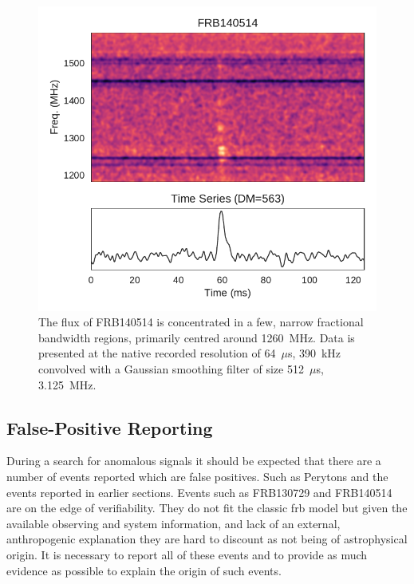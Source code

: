 \documentclass[a4paper,fleqn,usenatbib]{mnras}
\begin{document}
\begin{figure}
    \includegraphics[width=1.0\linewidth]{figures/FRB140514.pdf}
    \caption{The flux of FRB140514 is concentrated in a few, narrow fractional
    bandwidth regions, primarily centred around 1260~MHz.  Data is presented at
    the native recorded resolution of 64~$\mu$s, 390~kHz convolved with a
    Gaussian smoothing filter of size 512~$\mu$s, 3.125~MHz.
    }
    \label{fig:FRB140514}
\end{figure}

\subsection{False-Positive Reporting}

During a search for anomalous signals it should be expected that there are a
number of events reported which are false positives. Such as Perytons
\citep{2011ApJ...727...18B} and the events reported in earlier sections. Events
such as FRB130729 and FRB140514 are on the edge of verifiability. They do not
fit the classic \gls{frb} model but given the available observing and system
information, and lack of an external, anthropogenic explanation they are hard
to discount as not being of astrophysical origin. It is necessary to report
all of these events and to provide as much evidence as possible to explain the
origin of such events.
\end{document}
